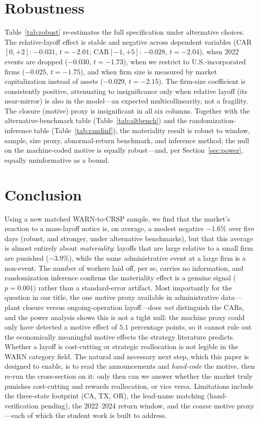 \documentclass[12pt]{article}
\begin{document}
\section{Robustness}\label{sec:robust}
Table~\ref{tab:robust} re-estimates the full specification under alternative
choices. The relative-layoff effect is stable and negative across dependent
variables (CAR$[0,+2]$: $-0.031$, $t=-2.01$; CAR$[-1,+5]$: $-0.028$, $t=-2.04$),
when 2022 events are dropped ($-0.030$, $t=-1.73$), when we restrict to
U.S.-incorporated firms ($-0.025$, $t=-1.75$), and when firm size is measured by
market capitalization instead of assets ($-0.029$, $t=-2.15$). The firm-size
coefficient is consistently positive, attenuating to insignificance only when
relative layoff (its near-mirror) is also in the model---an expected
multicollinearity, not a fragility. The closure (motive) proxy is insignificant in
all six columns. Together with the alternative-benchmark table
(Table~\ref{tab:altbench}) and the randomization-inference table
(Table~\ref{tab:randinf}), the materiality result is robust to window, sample,
size proxy, abnormal-return benchmark, and inference method; the null on the
machine-coded motive is equally robust---and, per Section~\ref{sec:power}, equally
uninformative as a bound.

\section{Conclusion}\label{sec:concl}
Using a new matched WARN-to-CRSP sample, we find that the market's reaction to a
mass-layoff notice is, on average, a modest negative $-1.6\%$ over five days
(robust, and stronger, under alternative benchmarks), but that this average is
almost entirely about \emph{materiality}: layoffs that are large relative to a
small firm are punished ($-3.9\%$), while the same administrative event at a large
firm is a non-event. The number of workers laid off, per se, carries no
information, and randomization inference confirms the materiality effect is a
genuine signal ($p=0.001$) rather than a standard-error artifact. Most importantly
for the question in our title, the one motive proxy available in administrative
data---plant closure versus ongoing-operation layoff---does \emph{not} distinguish
the CARs, and the power analysis shows this is not a tight null: the machine proxy
could only have detected a motive effect of $5.1$ percentage points, so it cannot
rule out the economically meaningful motive effects the strategy literature
predicts. Whether a layoff is cost-cutting or strategic reallocation is not legible
in the WARN category field. The natural and necessary next step, which this paper
is designed to enable, is to read the announcements and \emph{hand-code} the
motive, then re-run the cross-section on it: only then can we answer whether the
market truly punishes cost-cutting and rewards reallocation, or vice versa.
Limitations include the three-state footprint (CA, TX, OR), the lead-name matching
(hand-verification pending), the 2022--2024 return window, and the coarse motive
proxy---each of which the student work is built to address.
\end{document}
